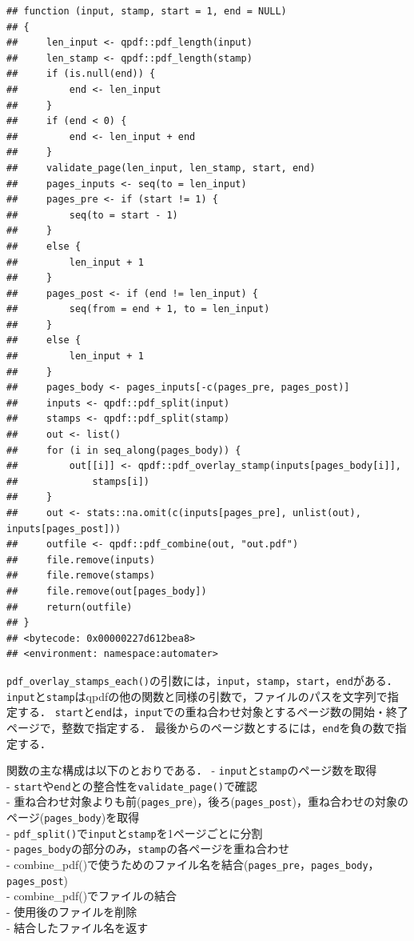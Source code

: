 \documentclass[
]{article}
\begin{document}
\begin{verbatim}
## function (input, stamp, start = 1, end = NULL) 
## {
##     len_input <- qpdf::pdf_length(input)
##     len_stamp <- qpdf::pdf_length(stamp)
##     if (is.null(end)) {
##         end <- len_input
##     }
##     if (end < 0) {
##         end <- len_input + end
##     }
##     validate_page(len_input, len_stamp, start, end)
##     pages_inputs <- seq(to = len_input)
##     pages_pre <- if (start != 1) {
##         seq(to = start - 1)
##     }
##     else {
##         len_input + 1
##     }
##     pages_post <- if (end != len_input) {
##         seq(from = end + 1, to = len_input)
##     }
##     else {
##         len_input + 1
##     }
##     pages_body <- pages_inputs[-c(pages_pre, pages_post)]
##     inputs <- qpdf::pdf_split(input)
##     stamps <- qpdf::pdf_split(stamp)
##     out <- list()
##     for (i in seq_along(pages_body)) {
##         out[[i]] <- qpdf::pdf_overlay_stamp(inputs[pages_body[i]], 
##             stamps[i])
##     }
##     out <- stats::na.omit(c(inputs[pages_pre], unlist(out), inputs[pages_post]))
##     outfile <- qpdf::pdf_combine(out, "out.pdf")
##     file.remove(inputs)
##     file.remove(stamps)
##     file.remove(out[pages_body])
##     return(outfile)
## }
## <bytecode: 0x00000227d612bea8>
## <environment: namespace:automater>
\end{verbatim}

\texttt{pdf\_overlay\_stamps\_each()}の引数には，\texttt{input}，\texttt{stamp}，\texttt{start}，\texttt{end}がある．
\texttt{input}と\texttt{stamp}はqpdfの他の関数と同様の引数で，ファイルのパスを文字列で指定する．
\texttt{start}と\texttt{end}は，\texttt{input}での重ね合わせ対象とするページ数の開始・終了ページで，整数で指定する．
最後からのページ数とするには，\texttt{end}を負の数で指定する．

関数の主な構成は以下のとおりである．
- \texttt{input}と\texttt{stamp}のページ数を取得\\
- \texttt{start}や\texttt{end}との整合性を\texttt{validate\_page()}で確認\\
- 重ね合わせ対象よりも前(\texttt{pages\_pre})，後ろ(\texttt{pages\_post})，重ね合わせの対象のページ(\texttt{pages\_body})を取得\\
- \texttt{pdf\_split()}で\texttt{input}と\texttt{stamp}を1ページごとに分割\\
- \texttt{pages\_body}の部分のみ，\texttt{stamp}の各ページを重ね合わせ\\
- combine\_pdf()で使うためのファイル名を結合(\texttt{pages\_pre}，\texttt{pages\_body}，\texttt{pages\_post})\\
- combine\_pdf()でファイルの結合\\
- 使用後のファイルを削除\\
- 結合したファイル名を返す
\end{document}
